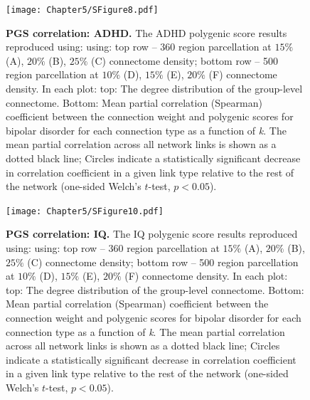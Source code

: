 \begin{figure}[h!]
\begin{center}
\texttt{[image: Chapter5/SFigure8.pdf]}%
\end{center}
\caption{\textbf{PGS correlation: ADHD.}
The ADHD polygenic score results reproduced using: using: top row -- 360 region parcellation at $15\%$ (A), $20\%$ (B), $25\%$ (C) connectome density; bottom row -- 500 region parcellation at $10\%$ (D), $15\%$ (E), $20\%$ (F) connectome density. In each plot: top: The degree distribution of the group-level connectome. Bottom: Mean partial correlation (Spearman) coefficient between the connection weight and polygenic scores for bipolar disorder for each connection type as a function of \textit{k}. The mean partial correlation across all network links is shown as a dotted black line; Circles indicate a statistically significant decrease in correlation coefficient in a given link type relative to the rest of the network (one-sided Welch's $t$-test, $p < 0.05$).}
\label{fig:Ch5SFig8}
\end{figure}

\begin{figure}[h!]
\begin{center}
\texttt{[image: Chapter5/SFigure10.pdf]}%
\end{center}
\caption{\textbf{PGS correlation: IQ.}
The IQ polygenic score results reproduced using: using: top row -- 360 region parcellation at $15\%$ (A), $20\%$ (B), $25\%$ (C) connectome density; bottom row -- 500 region parcellation at $10\%$ (D), $15\%$ (E), $20\%$ (F) connectome density. In each plot: top: The degree distribution of the group-level connectome. Bottom: Mean partial correlation (Spearman) coefficient between the connection weight and polygenic scores for bipolar disorder for each connection type as a function of \textit{k}. The mean partial correlation across all network links is shown as a dotted black line; Circles indicate a statistically significant decrease in correlation coefficient in a given link type relative to the rest of the network (one-sided Welch's $t$-test, $p < 0.05$).}
\label{fig:Ch5SFig10}
\end{figure}



